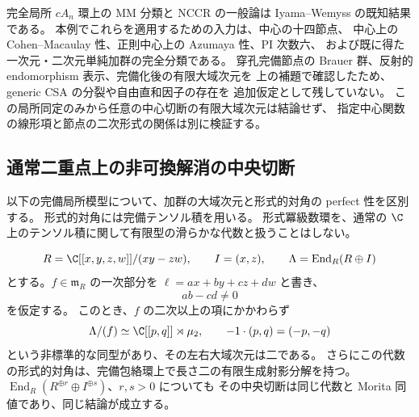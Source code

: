\begin{remark}[用いた既知結果と本例に固有の入力]
完全局所 $cA_n$ 環上の MM 分類と NCCR の一般論は
Iyama--Wemyss の既知結果である。
本例でこれらを適用するための入力は、中心の十四節点、
中心上の Cohen--Macaulay 性、正則中心上の Azumaya 性、PI 次数六、
および既に得た一次元・二次元単純加群の完全分類である。
穿孔完備節点の Brauer 群、反射的 endomorphism 表示、完備化後の有限大域次元を
上の補題で確認したため、generic CSA の分裂や自由直和因子の存在を
追加仮定として残していない。
この局所同定のみから任意の中心切断の有限大域次元は結論せず、
指定中心関数の線形項と節点の二次形式の関係は別に検証する。
\end{remark}


\subsection{通常二重点上の非可換解消の中央切断}
\label{cmo:subsec:conifold-slice}

以下の完備局所模型について、加群の大域次元と形式的対角の perfect 性を区別する。
形式的対角には完備テンソル積を用いる。
形式冪級数環を、通常の $\C$ 上のテンソル積に関して有限型の滑らかな代数と扱うことはしない。

\begin{proposition}[非等方な中央切断]
\label{cmo:prop:conifold-nonisotropic-slice}
\[
 R=\C[[x,y,z,w]]/(xy-zw),\qquad
 I=(x,z),\qquad \Lambda=\operatorname{End}_R(R\oplus I)
\]
とする。$f\in\mathfrak m_R$ の一次部分を
$\ell=a x+b y+c z+d w$ と書き、
\begin{equation}\label{cmo:eq:conifold-dual-nonisotropic}
 ab-cd\ne0
\end{equation}
を仮定する。
このとき、$f$ の二次以上の項にかかわらず
\[
 \Lambda/(f)\simeq\C[[p,q]]\rtimes\mu_2,
 \qquad -1\cdot(p,q)=(-p,-q)
\]
という非標準的な同型があり、その左右大域次元は二である。
さらにこの代数の形式的対角は、完備包絡環上で長さ二の有限生成射影分解を持つ。
$\operatorname{End}_R(R^{\oplus r}\oplus I^{\oplus s})$、$r,s>0$ についても
その中央切断は同じ代数と Morita 同値であり、同じ結論が成立する。
\end{proposition}

